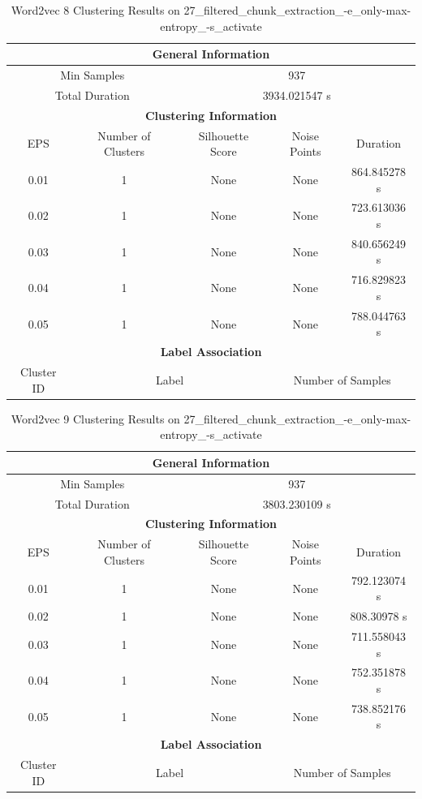 \begin{longtable}{|c|c|c|c|c|}
\caption{Word2vec 8 Clustering Results on 27\_filtered\_chunk\_extraction\_-e\_only-max-entropy\_-s\_activate} \label{tab:27_filtered_chunk_extraction_-e_only-max-entropy_-s_activate_word2vec_8_clustering_results}\\
\hline
\multicolumn{5}{|c|}{\textbf{General Information}} \\
\hline
\multicolumn{2}{|c|}{Min Samples} & \multicolumn{3}{c|}{937} \\
\multicolumn{2}{|c|}{Total Duration} & \multicolumn{3}{c|}{3934.021547 s} \\
\hline
\multicolumn{5}{|c|}{\textbf{Clustering Information}} \\
\hline
EPS & Number of Clusters & Silhouette Score & Noise Points & Duration \\
0.01 & 1 & None & None & 864.845278 s\\
0.02 & 1 & None & None & 723.613036 s\\
0.03 & 1 & None & None & 840.656249 s\\
0.04 & 1 & None & None & 716.829823 s\\
0.05 & 1 & None & None & 788.044763 s\\
\hline
\multicolumn{5}{|c|}{\textbf{Label Association}} \\
\hline
Cluster ID & \multicolumn{2}{c|}{Label} & \multicolumn{2}{c|}{Number of Samples} \\
\hline
\end{longtable}


\begin{longtable}{|c|c|c|c|c|}
\caption{Word2vec 9 Clustering Results on 27\_filtered\_chunk\_extraction\_-e\_only-max-entropy\_-s\_activate} \label{tab:27_filtered_chunk_extraction_-e_only-max-entropy_-s_activate_word2vec_9_clustering_results}\\
\hline
\multicolumn{5}{|c|}{\textbf{General Information}} \\
\hline
\multicolumn{2}{|c|}{Min Samples} & \multicolumn{3}{c|}{937} \\
\multicolumn{2}{|c|}{Total Duration} & \multicolumn{3}{c|}{3803.230109 s} \\
\hline
\multicolumn{5}{|c|}{\textbf{Clustering Information}} \\
\hline
EPS & Number of Clusters & Silhouette Score & Noise Points & Duration \\
0.01 & 1 & None & None & 792.123074 s\\
0.02 & 1 & None & None & 808.30978 s\\
0.03 & 1 & None & None & 711.558043 s\\
0.04 & 1 & None & None & 752.351878 s\\
0.05 & 1 & None & None & 738.852176 s\\
\hline
\multicolumn{5}{|c|}{\textbf{Label Association}} \\
\hline
Cluster ID & \multicolumn{2}{c|}{Label} & \multicolumn{2}{c|}{Number of Samples} \\
\hline
\end{longtable}


